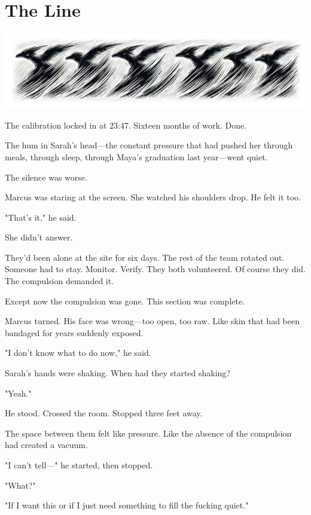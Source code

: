 \chapter{The Line}
\label{ch:29}



\begin{center}
\includegraphics[width=\textwidth]{images/chapterImages/genesis_sketch_00126_.png}
\end{center}

The calibration locked in at 23:47. Sixteen months of work. Done.

The hum in Sarah's head—the constant pressure that had pushed her through meals, through sleep, through Maya's graduation last year—went quiet.

The silence was worse.

Marcus was staring at the screen. She watched his shoulders drop. He felt it too.

"That's it," he said.

She didn't answer.

They'd been alone at the site for six days. The rest of the team rotated out. Someone had to stay. Monitor. Verify. They both volunteered. Of course they did. The compulsion demanded it.

Except now the compulsion was gone. This section was complete.

Marcus turned. His face was wrong—too open, too raw. Like skin that had been bandaged for years suddenly exposed.

"I don't know what to do now," he said.

Sarah's hands were shaking. When had they started shaking?

"Yeah."

He stood. Crossed the room. Stopped three feet away.

The space between them felt like pressure. Like the absence of the compulsion had created a vacuum.

"I can't tell—" he started, then stopped.

"What?"

"If I want this or if I just need something to fill the fucking quiet."

